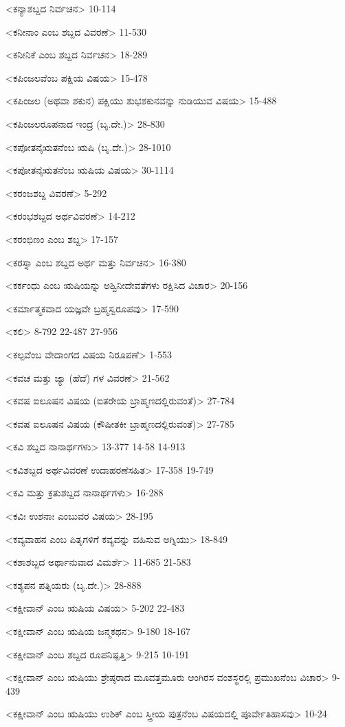 <ಕನ್ಯಾಶಬ್ದದ ನಿರ್ವಚನ>
10-114

<ಕನೀನಾಂ ಎಂಬ ಶಬ್ದದ ವಿವರಣೆ>
11-530

<ಕನೀನಿಕೆ ಎಂಬ ಶಬ್ದದ ನಿರ್ವಚನ>
18-289

<ಕಪಿಂಜಲವೆಂಬ ಪಕ್ಷಿಯ ವಿಷಯ>
15-478

<ಕಪಿಂಜಲ (ಅಥವಾ ಶಕುನ) ಪಕ್ಷಿಯು ಶುಭಶಕುನವನ್ನು ನುಡಿಯುವ ವಿಷಯ>
15-488

<ಕಪಿಂಜಲರೂಪನಾದ ಇಂದ್ರ (ಬೃ.ದೇ.)>
28-830

<ಕಪೋತನೈಋತನೆಂಬ ಋಷಿ (ಬೃ.ದೇ.)>
28-1010

<ಕಪೋತನೈಋತನೆಂಬ ಋಷಿಯ ವಿಷಯ>
30-1114

<ಕರಂಜಶಬ್ದ ವಿವರಣೆ>
5-292

<ಕರಂಭಶಬ್ದದ ಅರ್ಥವಿವರಣೆ>
14-212

<ಕರಂಭಿಣಂ ಎಂಬ ಶಬ್ದ>
17-157

<ಕರಸ್ನಾ ಎಂಬ ಶಬ್ದದ ಅರ್ಥ ಮತ್ತು ನಿರ್ವಚನ>
16-380

<ಕರ್ಕಂಧು ಎಂಬ ಋಷಿಯನ್ನು ಅಶ್ವಿನೀದೇವತೆಗಳು ರಕ್ಷಿಸಿದ ವಿಚಾರ>
20-156

<ಕರ್ಮಾತ್ಮಕವಾದ ಯಜ್ಞವೇ ಬ್ರಹ್ಮಸ್ವರೂಪವು>
17-590

<ಕಲಿ>
8-792
22-487 
27-956

<ಕಲ್ಪವೆಂಬ ವೇದಾಂಗದ ವಿಷಯ ನಿರೂಪಣೆ>
1-553

<ಕವಚ ಮತ್ತು ಜ್ಯಾ (ಹೆದೆ) ಗಳ ವಿವರಣೆ>
21-562

<ಕವಷ ಐಲೂಷನ ವಿಷಯ (ಐತರೇಯ ಬ್ರಾಹ್ಮಣದಲ್ಲಿರುವಂತೆ)>
27-784

<ಕವಷ ಐಲೂಷನ ವಿಷಯ (ಕೌಷೀತಕೀ ಬ್ರಾಹ್ಮಣದಲ್ಲಿರುವಂತೆ)>
27-785

<ಕವಿ ಶಬ್ದದ ನಾನಾರ್ಥಗಳು>
13-377 
14-58
14-913

<ಕವಿಶಬ್ದದ ಅರ್ಥವಿವರಣೆ ಉದಾಹರಣೆಸಹಿತ>
17-358
19-749

<ಕವಿ ಮತ್ತು ಕ್ರತುಶಬ್ದದ ನಾನಾರ್ಥಗಳು>
16-288

<ಕವಿಃ ಉಶನಾಃ ಎಂಬುವರ ವಿಷಯ>
28-195

<ಕವ್ಯವಾಹನ ಎಂಬ ಪಿತೃಗಳಿಗೆ ಕವ್ಯವನ್ನು ವಹಿಸುವ ಅಗ್ನಿಯು>
18-849

<ಕಶಾಶಬ್ದದ ಅರ್ಥಾನುವಾದ ವಿಮರ್ಶೆ>
11-685
21-583

<ಕಶ್ಯಪನ ಪತ್ನಿಯರು (ಬೃ.ದೇ.)>
28-888

<ಕಕ್ಷೀವಾನ್‍ ಎಂಬ ಋಷಿಯ ವಿಷಯ>
5-202
22-483

<ಕಕ್ಷೀವಾನ್‍ ಎಂಬ ಋಷಿಯ ಜನ್ಮಕಥನ>
9-180
18-167

<ಕಕ್ಷೀವಾನ್‍ ಎಂಬ ಶಬ್ದದ ರೂಪನಿಷ್ಪತ್ತಿ>
9-215
10-191

<ಕಕ್ಷೀವಾನ್‍ ಎಂಬ ಋಷಿಯು ಶ್ರೇಷ್ಠರಾದ ಮೂವತ್ತಮೂರು ಆಂಗಿರಸ ವಂಶಸ್ಥರಲ್ಲಿ ಪ್ರಮುಖನೆಂಬ ವಿಚಾರ>
9-439

<ಕಕ್ಷೀವಾನ್‍ ಎಂಬ ಋಷಿಯು ಉಶಿಕ್‍ ಎಂಬ ಸ್ತ್ರೀಯ ಪುತ್ರನೆಂಬ ವಿಷಯದಲ್ಲಿ ಪೂರ್ವೇತಿಹಾಸವು>
10-24


